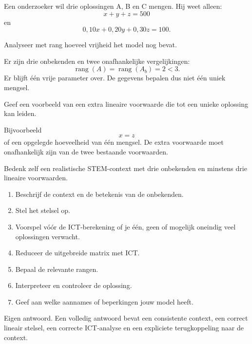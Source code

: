 \documentclass{ximera}
\begin{document}


\begin{oefening}{\oefG}

Een onderzoeker wil drie oplossingen A, B en C mengen. Hij weet alleen:
\[
x+y+z=500
\]
en
\[
0{,}10x+0{,}20y+0{,}30z=100.
\]

\begin{question}
Analyseer met rang hoeveel vrijheid het model nog bevat.
\begin{oplossing}
Er zijn drie onbekenden en twee onafhankelijke vergelijkingen:
\[
\operatorname{rang}(A)=\operatorname{rang}(A_b)=2<3.
\]
Er blijft één vrije parameter over. De gegevens bepalen dus niet één uniek mengsel.
\end{oplossing}
\end{question}

\begin{question}
Geef een voorbeeld van een extra lineaire voorwaarde die tot een unieke
oplossing kan leiden.
\begin{oplossing}
Bijvoorbeeld
\[
x=z
\]
of een opgelegde hoeveelheid van één mengsel. De extra voorwaarde moet
onafhankelijk zijn van de twee bestaande voorwaarden.
\end{oplossing}
\end{question}
\end{oefening}


\begin{oefening}{\oefG}
  
Bedenk zelf een realistische STEM-context met drie onbekenden en minstens
drie lineaire voorwaarden.

\begin{enumerate}
  \item Beschrijf de context en de betekenis van de onbekenden.
  \item Stel het stelsel op.
  \item Voorspel vóór de ICT-berekening of je één, geen of mogelijk
        oneindig veel oplossingen verwacht.
  \item Reduceer de uitgebreide matrix met ICT.
  \item Bepaal de relevante rangen.
  \item Interpreteer en controleer de oplossing.
  \item Geef aan welke aannames of beperkingen jouw model heeft.
\end{enumerate}

\begin{oplossing}
Eigen antwoord. Een volledig antwoord bevat een consistente context,
een correct lineair stelsel, een correcte ICT-analyse en een expliciete
terugkoppeling naar de context.
\end{oplossing}
\end{oefening}
\end{document}

